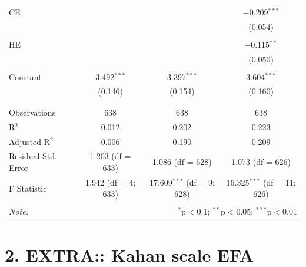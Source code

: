 \documentclass[
]{article}
\begin{document}
\begin{table}[!htbp]
\begin{tabular}{@{\extracolsep{5pt}}lccc}
 CE &  &  & $-$0.209$^{***}$ \\ 
  &  &  & (0.054) \\ 
  & & & \\ 
 HE &  &  & $-$0.115$^{**}$ \\ 
  &  &  & (0.050) \\ 
  & & & \\ 
 Constant & 3.492$^{***}$ & 3.397$^{***}$ & 3.604$^{***}$ \\ 
  & (0.146) & (0.154) & (0.160) \\ 
  & & & \\ 
\hline \\[-1.8ex] 
Observations & 638 & 638 & 638 \\ 
R$^{2}$ & 0.012 & 0.202 & 0.223 \\ 
Adjusted R$^{2}$ & 0.006 & 0.190 & 0.209 \\ 
Residual Std. Error & 1.203 (df = 633) & 1.086 (df = 628) & 1.073 (df = 626) \\ 
F Statistic & 1.942 (df = 4; 633) & 17.609$^{***}$ (df = 9; 628) & 16.325$^{***}$ (df = 11; 626) \\ 
\hline 
\hline \\[-1.8ex] 
\textit{Note:}  & \multicolumn{3}{r}{$^{*}$p$<$0.1; $^{**}$p$<$0.05; $^{***}$p$<$0.01} \\ 
\end{tabular} 
\end{table} 
\endgroup

\newpage

\hypertarget{extra-kahan-scale-efa}{%
\section{2. EXTRA:: Kahan scale EFA}\label{extra-kahan-scale-efa}}
\end{document}
